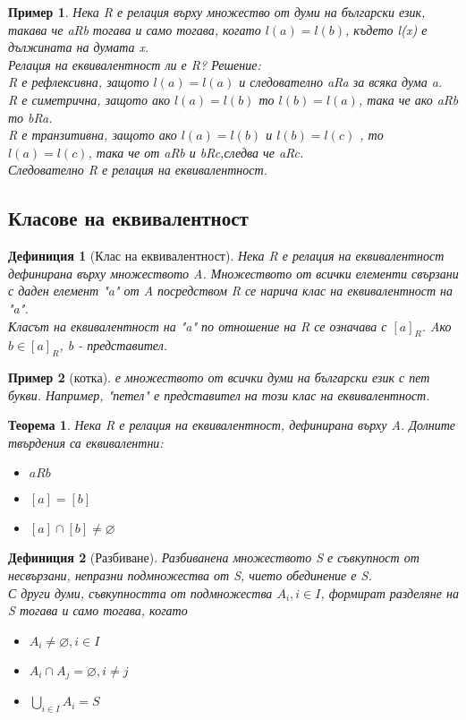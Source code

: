 \documentclass[fleqn, 12pt]{article}
\newtheorem{example}{Пример}[subsection]
\newtheorem{definition}{Дефиниция}[subsection]
\newtheorem{theorem}{Теорема}[subsection]
\begin{document}
\begin{example}
Нека R е релация върху множество от думи на български език, такава че aRb тогава и само тогава, когато $l(a) = l(b)$, където l(x) е дължината на думата x.\\
Релация на еквивалентност ли е R?
Решение: \\
R е рефлексивна, защото $l(a) = l(a)$ и следователно aRa за всяка дума a.\\
R е симетрична, защото ако $l(a) = l(b)$ то $l(b) = l(a)$, така че ако aRb то bRa.\\
R е транзитивна, защото ако $l(a) = l(b)$ и $l(b) = l(c)$ , то $l(a) = l(c)$, така че от aRb и bRc,следва че aRc.\\
Следователно R е релация на еквивалентност.
\end{example}

\subsection{Класове на еквивалентност}

\begin{definition}[Клас на еквивалентност]
Нека R е релация на еквивалентност дефинирана върху множеството A. Множеството от всички елементи свързани с даден елемент "a"\! от A посредством R се нарича клас на еквивалентност на "a". \\
Класът на еквивалентност на "a" \! по отношение на R се означава с $[a]_R$.
Aко $b \in [a]_R$, b - представител.
\end{definition}

\begin{example}
[котка] е множеството от всички думи на български език с пет букви. Например, "петел" е представител на този клас на еквивалентност.
\end{example}

\begin{theorem}
Нека R е релация на еквивалентност, дефинирана върху A. Долните твърдения са еквивалентни:
\begin{itemize}
\item $aRb$
\item $[a] = [b]$
\item $[a] \cap [b] \neq \varnothing$
\end{itemize}
\end{theorem}

\begin{definition}[Разбиване]
Разбиванена множеството S е съвкупност от несвързани, непразни подмножества от S, чието обединение е S. \\
С други думи, съвкупността от подмножества $A_i, i\in I$, формират разделяне на S тогава и само тогава, когато

\begin{itemize}
\item $A_i \neq \varnothing, i \in I$
\item $A_i \cap A_j = \varnothing, i \neq j$
\item $\bigcup_{i \in I} A_i = S$
\end{itemize}

\end{definition}
\end{document}
